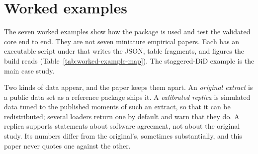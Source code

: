 \section{Worked examples}\label{sec:examples}

The seven worked examples show how the package is used and test the validated
core end to end. They are not seven miniature empirical papers. Each has
an executable script under  that writes the
JSON, table fragments, and figures the build reads
(Table~\ref{tab:worked-example-map}). The staggered-DiD example is the
main case study.

Two kinds of data appear, and the paper keeps them apart. An
\emph{original extract} is a public data set as a reference package ships
it. A \emph{calibrated replica} is simulated data tuned to the published
moments of such an extract, so that it can be redistributed; several
 loaders return one by default and warn that they do. A
replica supports statements about software agreement, not about the
original study. Its numbers differ from the original's, sometimes
substantially, and this paper never quotes one against the other.

